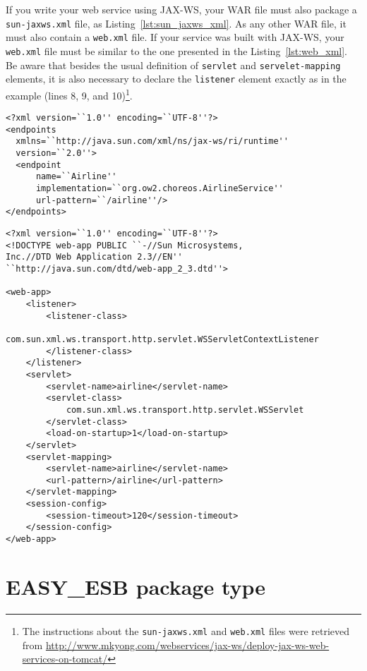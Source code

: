 If you write your web service using JAX-WS, your WAR file must also package a \texttt{sun-jaxws.xml} file, as Listing~\ref{lst:sun_jaxws_xml}. As any other WAR file, it must also contain a \texttt{web.xml} file. If your service was built with JAX-WS, your \texttt{web.xml} file must be similar to the one presented in the Listing~\ref{lst:web_xml}. Be aware that besides the usual definition of \texttt{servlet} and \texttt{servelet-mapping} elements, it is also necessary to declare the \texttt{listener} element exactly as in the example (lines 8, 9, and 10)\footnote{The instructions about the \texttt{sun-jaxws.xml} and \texttt{web.xml} files were retrieved from \url{http://www.mkyong.com/webservices/jax-ws/deploy-jax-ws-web-services-on-tomcat/}}.

{\footnotesize
\begin{lstlisting}[caption=Example of \texttt{sun-jaxws.xml} file, label=lst:sun_jaxws_xml]
<?xml version=``1.0'' encoding=``UTF-8''?>
<endpoints
  xmlns=``http://java.sun.com/xml/ns/jax-ws/ri/runtime''
  version=``2.0''>
  <endpoint
      name=``Airline''
      implementation=``org.ow2.choreos.AirlineService''
      url-pattern=``/airline''/>
</endpoints>
\end{lstlisting}
}

{\footnotesize
\begin{lstlisting}[caption=Example of \texttt{web.xml} file, label=lst:web_xml]
<?xml version=``1.0'' encoding=``UTF-8''?>
<!DOCTYPE web-app PUBLIC ``-//Sun Microsystems, 
Inc.//DTD Web Application 2.3//EN''
``http://java.sun.com/dtd/web-app_2_3.dtd''>
 
<web-app>
    <listener>
        <listener-class>
                com.sun.xml.ws.transport.http.servlet.WSServletContextListener
        </listener-class>
    </listener>
    <servlet>
        <servlet-name>airline</servlet-name>
        <servlet-class>
        	com.sun.xml.ws.transport.http.servlet.WSServlet
        </servlet-class>
        <load-on-startup>1</load-on-startup>
    </servlet>
    <servlet-mapping>
        <servlet-name>airline</servlet-name>
        <url-pattern>/airline</url-pattern>
    </servlet-mapping>
    <session-config>
        <session-timeout>120</session-timeout>
    </session-config>
</web-app>
\end{lstlisting}
}

\section{EASY\_ESB package type}

